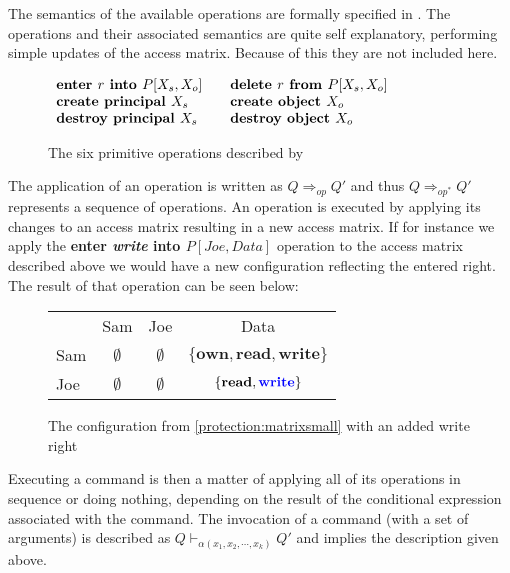 The semantics of the available operations are formally specified in \cite[p. 463]{HRU}.
The operations and their associated semantics are quite self explanatory, performing simple updates of the access matrix.
Because of this they are not included here.

\begin{figure}
\centering
$\begin{array}{l l}
  \textbf{enter } r \textbf{ into } P[X_s, X_o]\quad & \textbf{delete } r \textbf{ from } P[X_s, X_o]\\
  \textbf{create principal{} } X_s & \textbf{create object } X_o\\
  \textbf{destroy principal{} } X_s & \textbf{destroy object } X_o
 \end{array}$
 \caption{The six primitive operations described by \cite{HRU}}
 \label{protection:operations}
\end{figure}

The application of an operation is written as $Q \Rightarrow_{op} Q'$ and thus $Q \Rightarrow_{op^*} Q'$ represents a sequence of operations.
An operation is executed by applying its changes to an access matrix resulting in a new access matrix.
If for instance we apply the \textbf{enter \textit{write} into $P[Joe, Data]$} operation to the access matrix described above we would have a new configuration reflecting the entered right.
The result of that operation can be seen below:

\begin{figure}
\centering
\begin{tabular}{l|c|c|c|}
\multicolumn{1}{c}{} & \multicolumn{1}{c}{Sam} & \multicolumn{1}{c}{Joe} & \multicolumn{1}{c}{Data} \\\cline{2-4}
Sam & $\emptyset$ & $\emptyset$ & $\{\textbf{own}, \textbf{read}, \textbf{write}\}$ \\\cline{2-4}
Joe & $\emptyset$ & $\emptyset$ & $\{\textbf{read}, {\color{blue}\textbf{write}}\}$ \\\cline{2-4}
\end{tabular}
\caption{The configuration from \cref{protection:matrixsmall} with an added write right}
\label{protection:matrixwithwrite}
\end{figure}

Executing a command is then a matter of applying all of its operations in sequence or doing nothing, depending on the result of the conditional expression associated with the command.
The invocation of a command (with a set of arguments) is described as $Q \vdash_{\alpha(x_1, x_2, \cdots, x_k)} Q'$ and implies the description given above.

